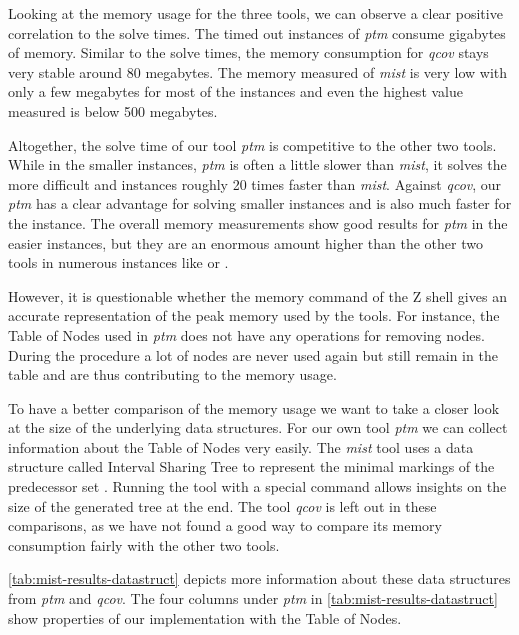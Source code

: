 Looking at the memory usage for the three tools, we can observe a clear positive correlation to the solve times. The timed out instances of \textit{ptm} consume gigabytes of memory. Similar to the solve times, the memory consumption for \textit{qcov} stays very stable around 80 megabytes. The memory measured of \textit{mist} is very low with only a few megabytes for most of the instances and even the highest value measured is below 500 megabytes.

Altogether, the solve time of our tool \textit{ptm} is competitive to the other two tools. While in the smaller instances, \textit{ptm} is often a little slower than \textit{mist}, it solves the more difficult  and  instances roughly 20 times faster than \textit{mist}.
Against \textit{qcov}, our \textit{ptm} has a clear advantage for solving smaller instances and is also much faster for the  instance.
The overall memory measurements show good results for \textit{ptm} in the easier instances, but they are an enormous amount higher than the other two tools in numerous instances like  or .

\bigbreak

However, it is questionable whether the memory command of the Z shell gives an accurate representation of the peak memory used by the tools. For instance, the Table of Nodes used in \textit{ptm} does not have any operations for removing nodes. During the procedure a lot of nodes are never used again but still remain in the table and are thus contributing to the memory usage.

To have a better comparison of the memory usage we want to take a closer look at the size of the underlying data structures. For our own tool \textit{ptm} we can collect information about the Table of Nodes very easily. The \textit{mist} tool uses a data structure called Interval Sharing Tree to represent the minimal markings of the predecessor set \cite{ganty_07,ganty_15}. Running the tool with a special command allows insights on the size of the generated tree at the end. 
The tool \textit{qcov} is left out in these comparisons, as we have not found a good way to compare its memory consumption fairly with the other two tools. 
\bigbreak

\autoref{tab:mist-results-datastruct} depicts more information about these data structures from \textit{ptm} and \textit{qcov}.
The four columns under \textit{ptm} in \autoref{tab:mist-results-datastruct} show properties of our implementation with the Table of Nodes.

